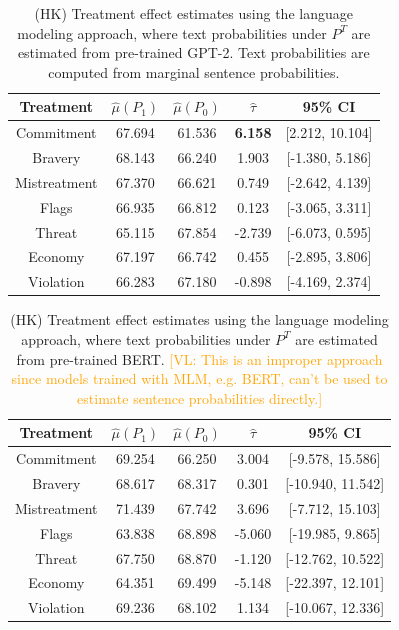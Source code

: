 \documentclass{article}
\newcommand{\vl}[1]{\textcolor{orange}{[VL: #1]}}
\begin{document}
\begin{table}[!ht]
    \centering
    \begin{tabular}{c|cccc}
        \toprule
        Treatment & $\hat{\mu}(P_1)$ & $\hat{\mu}(P_0)$ & $\hat{\tau}$ & 95\% CI \\
        \midrule
        Commitment & 67.694 & 61.536 & \textbf{\textcolor{green!50!black}{6.158}} & [2.212, 10.104] \\
        Bravery & 68.143 & 66.240 & \textcolor{green!50!black}{1.903} & [-1.380, 5.186] \\
        Mistreatment & 67.370 & 66.621 & \textcolor{green!50!black}{0.749} & [-2.642, 4.139] \\
        Flags & 66.935 & 66.812 & \textcolor{green!50!black}{0.123} & [-3.065, 3.311] \\
        Threat & 65.115 & 67.854 & \textcolor{red!80!black}{-2.739} & [-6.073, 0.595] \\
        Economy & 67.197 & 66.742 & \textcolor{green!50!black}{0.455} & [-2.895, 3.806] \\
        Violation & 66.283 & 67.180 & \textcolor{red!80!black}{-0.898} & [-4.169, 2.374] \\
        \bottomrule
    \end{tabular}
    \caption{(HK) Treatment effect estimates using the language modeling approach, where text probabilities under $P^T$ are estimated from pre-trained GPT-2. Text probabilities are computed from marginal sentence probabilities.}
    \label{tab:results_lm3_old}
\end{table}

\begin{table}[!ht]
    \centering
    \begin{tabular}{c|cccc}
        \toprule
        Treatment & $\hat{\mu}(P_1)$ & $\hat{\mu}(P_0)$ & $\hat{\tau}$ & 95\% CI \\
        \midrule
        Commitment & 69.254 & 66.250 & \textcolor{green!50!black}{3.004} & [-9.578, 15.586] \\
        Bravery & 68.617 & 68.317 & \textcolor{green!50!black}{0.301} & [-10.940, 11.542] \\
        Mistreatment & 71.439 & 67.742 & \textcolor{green!50!black}{3.696} & [-7.712, 15.103] \\
        Flags & 63.838 & 68.898 & \textcolor{red!80!black}{-5.060} & [-19.985, 9.865] \\
        Threat & 67.750 & 68.870 & \textcolor{red!80!black}{-1.120} & [-12.762, 10.522] \\
        Economy & 64.351 & 69.499 & \textcolor{red!80!black}{-5.148} & [-22.397, 12.101] \\
        Violation & 69.236 & 68.102 & \textcolor{green!50!black}{1.134} & [-10.067, 12.336] \\
        \bottomrule
    \end{tabular}
    \caption{(HK) Treatment effect estimates using the language modeling approach, where text probabilities under $P^T$ are estimated from pre-trained BERT. \vl{This is an improper approach since models trained with MLM, e.g. BERT, can't be used to estimate sentence probabilities directly.}}
    \label{tab:results_lm1_bert}
\end{table}

\newpage


\end{document}
